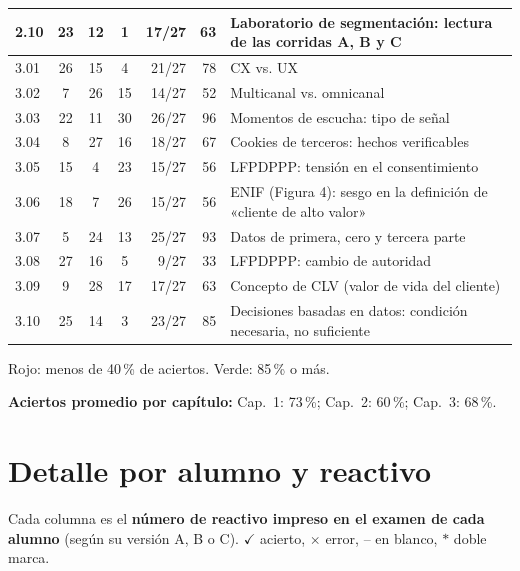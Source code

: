 \documentclass[10pt,letterpaper]{article}
\begin{document}
{\begin{longtable}{@{}l c c c r r l@{}}
2.10 & 23 & 12 & 1 & 17/27 & 63 & Laboratorio de segmentación: lectura de las corridas A, B y C\\
\midrule
3.01 & 26 & 15 & 4 & 21/27 & 78 & CX vs. UX\\
3.02 & 7 & 26 & 15 & 14/27 & 52 & Multicanal vs. omnicanal\\
3.03 & 22 & 11 & 30 & 26/27 & \cellcolor{verde!12}96 & Momentos de escucha: tipo de señal\\
3.04 & 8 & 27 & 16 & 18/27 & 67 & Cookies de terceros: hechos verificables\\
3.05 & 15 & 4 & 23 & 15/27 & 56 & LFPDPPP: tensión en el consentimiento\\
3.06 & 18 & 7 & 26 & 15/27 & 56 & ENIF (Figura 4): sesgo en la definición de «cliente de alto valor»\\
3.07 & 5 & 24 & 13 & 25/27 & \cellcolor{verde!12}93 & Datos de primera, cero y tercera parte\\
3.08 & 27 & 16 & 5 & 9/27 & \cellcolor{rojo!15}33 & LFPDPPP: cambio de autoridad\\
3.09 & 9 & 28 & 17 & 17/27 & 63 & Concepto de CLV (valor de vida del cliente)\\
3.10 & 25 & 14 & 3 & 23/27 & \cellcolor{verde!12}85 & Decisiones basadas en datos: condición necesaria, no suficiente\\
\end{longtable}}
{\footnotesize Rojo: menos de 40\,\% de aciertos. Verde: 85\,\% o más.}
\par\medskip\textbf{Aciertos promedio por capítulo:} Cap.\ 1: 73\,\%; Cap.\ 2: 60\,\%; Cap.\ 3: 68\,\%.
\newpage\section*{Detalle por alumno y reactivo}
Cada columna es el \textbf{número de reactivo impreso en el examen de cada alumno} (según su versión A, B o C). \textcolor{verde}{$\checkmark$} acierto, \textcolor{rojo}{$\times$} error, \textcolor{rojo}{--} en blanco, \textcolor{rojo}{$\ast$} doble marca.
\end{document}
